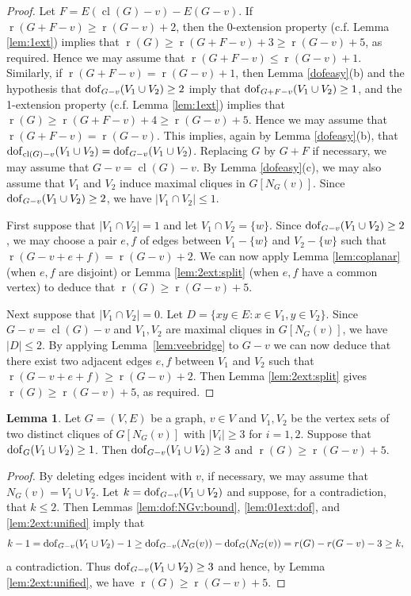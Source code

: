 \documentclass[11pt,a4paper]{article}
\theoremstyle{definition}
\newtheorem{lemma}[theorem]{Lemma}
\DeclareMathOperator{\rr}{r}
\DeclareMathOperator{\cl}{cl}
\newcommand{\dof}{{\rm dof}}
\begin{document}
\begin{proof}
Let $F=E(\cl(G)-v)-E(G-v)$. 
If 
$\rr(G+F-v)\geq \rr(G-v)+2$, then the 0-extension property (c.f. Lemma \ref{lem:1ext})
implies that $\rr(G)\geq \rr(G+F-v)+3\geq \rr(G-v)+5$, as required. Hence we may assume that $\rr(G+F-v)\leq \rr(G-v)+1$. Similarly, if
$\rr(G+F-v)=\rr(G-v)+1$, then Lemma \ref{dofeasy}(b)  and the hypothesis that $\dof_{G-v}(V_1\cup V_2)\geq 2$ imply that $\dof_{G+F-v}(V_1\cup V_2)\geq 1$,
and the 1-extension property (c.f. Lemma \ref{lem:1ext})
implies that $\rr(G)\geq \rr(G+F-v)+4\geq \rr(G-v)+5$.
Hence we may assume that $\rr(G+F-v)=\rr(G-v)$. This implies, again by Lemma \ref{dofeasy}(b), that
$\dof_{\cl(G)-v}(V_1\cup V_2)=\dof_{G-v}(V_1\cup V_2)$. Replacing $G$ by $G+F$ if necessary, we may assume that $G-v=\cl(G)-v$. By Lemma \ref{dofeasy}(c), we may also assume that $V_1$ and $V_2$ induce maximal cliques in $G[N_G(v)]$.
Since  $\dof_{G-v}(V_1\cup V_2)\geq 2$, we have
$|V_1\cap V_2|\leq 1$. 

First suppose that $|V_1\cap V_2|=  1$ and let $V_1\cap V_2=\{w\}$. 
Since $\dof_{G-v}(V_1\cup V_2)\geq 2$, we may choose a pair $e,f$ of edges between $V_1-\{w\}$ and $V_2-\{w\}$ such that $\rr(G-v+e+f)= \rr(G-v)+2$. We can now apply Lemma \ref{lem:coplanar} (when $e,f$ are disjoint) or Lemma  \ref{lem:2ext:split} (when $e,f$ have a common vertex) to deduce that $\rr(G)\geq  \rr(G-v)+5$.

Next suppose that $|V_1\cap V_2|=0$. 
Let $D=\{xy\in E: x\in V_1, y\in V_2\}$. Since $G-v=\cl(G)-v$ and $V_1,V_2$ are maximal cliques in $G[N_G(v)]$, we have $|D|\leq 2$.
By applying  Lemma~\ref{lem:veebridge} to $G-v$ we can now deduce  that there exist two adjacent edges $e,f$ between $V_1$ and $V_2$ such that $\rr(G-v+e+f)\geq \rr(G-v)+2$.
Then Lemma \ref{lem:2ext:split} gives  $\rr(G)\geq \rr(G-v)+5$, as required.
\end{proof}

\begin{lemma}\label{lem:useful}
Let $G=(V,E)$ be a graph, $v\in V$ and $V_1,V_2$ be the vertex sets of two distinct  cliques of $G[N_G(v)]$ with $|V_i|\geq 3$ for $i=1,2$. Suppose that $\dof_{G}(V_1\cup V_2)\geq 1$.
Then $\dof_{G-v}(V_1\cup V_2)\geq 3$ and $\rr(G)\geq \rr(G-v)+5$.
\end{lemma}
\begin{proof} 
By deleting edges incident with $v$, if necessary,
we may assume that $N_G(v)=V_1\cup V_2$. 
Let $k=\dof_{G-v}(V_1\cup V_2)$ and suppose, for a contradiction,  that $k\leq 2$. Then
Lemmas \ref{lem:dof:NGv:bound}, \ref{lem:01ext:dof}, and \ref{lem:2ext:unified} imply that
$$k-1=			\dof_{G-v}(V_1\cup V_2)-1
\geq \dof_{G-v}(N_G(v))-\dof_{G}(N_G(v))
=  r(G)-r(G-v)-3 \geq k,$$
a contradiction.
Thus $\dof_{G-v}(V_1\cup V_2)\geq 3$ and hence, by Lemma 
\ref{lem:2ext:unified}, we have $\rr(G)\geq \rr(G-v)+5$.
\end{proof}
\end{document}
